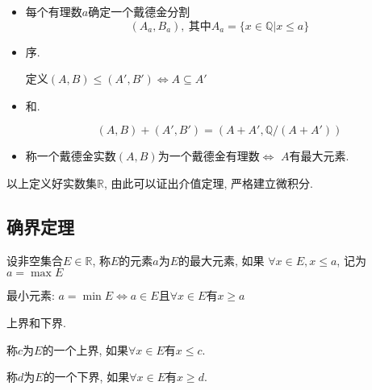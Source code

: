 \begin{itemize}
    \item 每个有理数$a$确定一个戴德金分割
    \begin{equation}
      (A_a,B_a), \ \text{其中} A_a = \{x\in \mathbb{Q} | x \le a\}
    \end{equation}

    \item 序.

    定义$(A,B) \le  (A',B') \iff A \subseteq A'$
    
    \item 和.
    
    \begin{equation}
      (A,B) + (A',B') = (A+A', \mathbb{Q}/(A+A'))
    \end{equation}

    \item 称一个戴德金实数$(A,B)$为一个戴德金有理数$\iff$ $A$有最大元素.
\end{itemize}

以上定义好实数集$\mathbb{R}$, 由此可以证出介值定理, 严格建立微积分.

\subsection{确界定理}
\begin{definition}
    设非空集合$E\in \mathbb{R}$, 称$E$的元素$a$为$E$的最大元素, 如果
    $\forall x\in E, x\le a$, 记为 $a = \max E$

    最小元素:
    $a =\min E \iff a \in E \text{且} \forall x\in E \text{有} x\ge a$
\end{definition}

\begin{definition}上界和下界.

    称$c$为$E$的一个上界, 如果$\forall x\in E\text{有}x\le c$.

    称$d$为$E$的一个下界, 如果$\forall x\in E\text{有}x\ge d$.
\end{definition}

